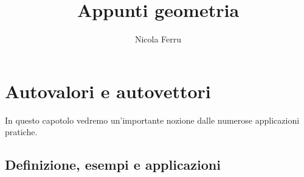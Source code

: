 \documentclass{book}
\title{Appunti geometria}
\author{Nicola Ferru}
\begin{document}
\maketitle
\tableofcontents
\listoftables
\listoffigures







\chapter{Autovalori e autovettori}
\label{chap:Autovalori e autovettori}

In questo capotolo vedremo un'importante nozione dalle numerose applicazioni
pratiche.

\section{Definizione, esempi e applicazioni}
\label{sec:Definizione, esempi e applicazioni}
\end{document}
